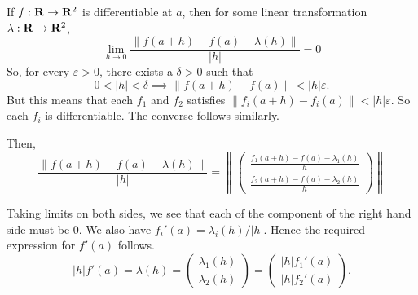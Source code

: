 \begin{solution}
    If $f:\mathbf{R}\to\mathbf{R}^2$ is differentiable
    at $a$, 
    then for some linear
    transformation $\lambda:\mathbf{R}\to\mathbf{R}^2$,
    $$\lim_{h\to 0}
    {\frac{\|f(a+h)-f(a)-\lambda(h)\|}
    {\vert h\vert}}
    =0$$
    So, for every $\varepsilon>0$, there
    exists a $\delta>0$ such that
    $$0<\vert h\vert <\delta\implies
    \|f(a+h)-f(a)\|<
    \vert h\vert\varepsilon.$$
    But this means that each $f_1$ and
    $f_2$ satisfies
    $\|f_i(a+h)-f_i(a)\|<\vert h\vert
    \varepsilon.$ So each $f_i$ is
    differentiable. The converse follows
    similarly.

    Then,
    $$\frac{\|f(a+h)-f(a)-\lambda(h)\|}
    {\vert h\vert}=\left\lVert\left(
        \begin{matrix}
        \frac{f_1(a+h)-f(a)-\lambda_1(h)}
        {h}\\
        \frac{f_2(a+h)-f(a)-\lambda_2(h)}
        {h}
        \end{matrix}\right)\right\rVert$$
    
    Taking limits on both sides,
    we see that each of the component
    of the right
    hand side must be $0$. We also have
    $f_i'(a)=\lambda_i(h)/\vert h\vert.$
    Hence the
    required expression for $f'(a)$
    follows.
    $$\vert h\vert f'(a)=
    \lambda(h) =
    \left(
    \begin{matrix}
        \lambda_1(h)\\
        \lambda_2(h)
    \end{matrix}\right)
    =
    \left(
    \begin{matrix}
        \vert h\vert f_1'(a)\\
        \vert h\vert f_2'(a)
    \end{matrix}\right).
    $$
\end{solution}